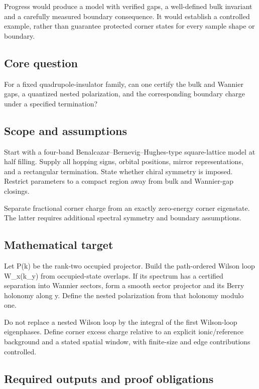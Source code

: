 \documentclass[
  11pt,
]{article}
\begin{document}
Progress would produce a model with verified gaps, a well-defined bulk
invariant and a carefully measured boundary consequence. It would
establish a controlled example, rather than guarantee protected corner
states for every sample shape or boundary.

\subsection{Core question}

For a fixed quadrupole-insulator family, can one certify the bulk and
Wannier gaps, a quantized nested polarization, and the corresponding
boundary charge under a specified termination?

\subsection{Scope and assumptions}

Start with a four-band Benalcazar--Bernevig--Hughes-type square-lattice
model at half filling. Supply all hopping signs, orbital positions,
mirror representations, and a rectangular termination. State whether
chiral symmetry is imposed. Restrict parameters to a compact region away
from bulk and Wannier-gap closings.

Separate fractional corner charge from an exactly zero-energy corner
eigenstate. The latter requires additional spectral symmetry and
boundary assumptions.

\subsection{Mathematical target}

Let P(k) be the rank-two occupied projector. Build the path-ordered
Wilson loop W\_x(k\_y) from occupied-state overlaps. If its spectrum has
a certified separation into Wannier sectors, form a smooth sector
projector and its Berry holonomy along y. Define the nested polarization
from that holonomy modulo one.

Do not replace a nested Wilson loop by the integral of the first
Wilson-loop eigenphases. Define corner excess charge relative to an
explicit ionic/reference background and a stated spatial window, with
finite-size and edge contributions controlled.

\subsection{Required outputs and proof obligations}
\end{document}
